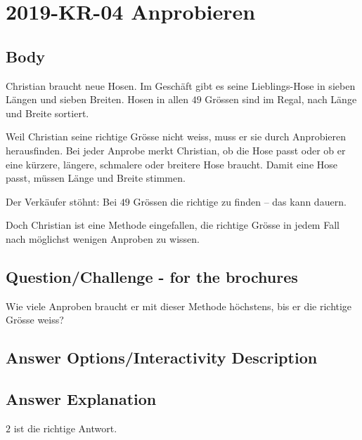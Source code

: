 \documentclass[a4paper,11pt]{report}
\newcommand{\taskGraphicsFolder}{..}
\begin{document}
\section*{\centering{} 2019-KR-04 Anprobieren}


\subsection*{Body}

Christian braucht neue Hosen. Im Geschäft gibt es seine Lieblings-Hose in sieben Längen und sieben Breiten. Hosen in allen $49$ Grössen sind im Regal, nach Länge und Breite sortiert.

Weil Christian seine richtige Grösse nicht weiss, muss er sie durch Anprobieren herausfinden.
Bei jeder Anprobe merkt Christian, ob die Hose passt oder ob er eine kürzere, längere, schmalere oder breitere Hose braucht.
Damit eine Hose passt, müssen Länge und Breite stimmen.

{\centering%
\par}

Der Verkäufer stöhnt: Bei $49$ Grössen die richtige zu finden – das kann dauern.

Doch Christian ist eine Methode eingefallen, die richtige Grösse in jedem Fall nach möglichst wenigen Anproben zu wissen.

{\em


\subsection*{Question/Challenge - for the brochures}

Wie viele Anproben braucht er mit dieser Methode höchstens, bis er die richtige Grösse weiss?

}

\begingroup
\renewcommand{\arraystretch}{1.5}
\subsection*{Answer Options/Interactivity Description}



\endgroup

\subsection*{Answer Explanation}

$2$ ist die richtige Antwort.
\end{document}
